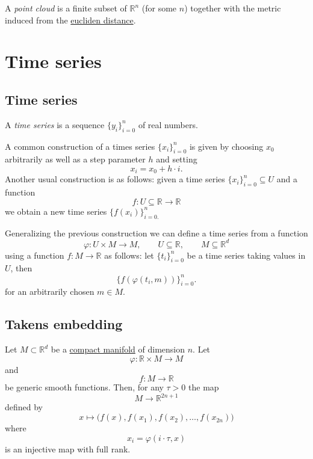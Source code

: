 \documentclass{amsart}
\begin{document}
	A \textit{point cloud} is a finite subset of $\mathbb{R}^n$ (for some $n$) together with the metric induced from the \hyperref[euclidean distance and norm]{eucliden distance}.
	
	\section{Time series}
	
	\subsection*{Time series} \label{time series}
	
	A \textit{time series} is a sequence $\{y_i\}_{i = 0}^n$ of real numbers. 
	
	A common construction of a times series $\{x_i\}_{i = 0}^n$ is given by choosing $x_0$ arbitrarily as well as a step parameter $h$ and setting
	\begin{equation*}
	x_i = x_0 + h\cdot i.
	\end{equation*}
	Another usual construction is as follows: given a time series $\{x_i\}_{i = 0}^n \subseteq U$ and a function
	\begin{equation*}
	f : U \subseteq \mathbb R \to \mathbb R
	\end{equation*}
	we obtain a new time series $\{f(x_i)\}_{i = 0.}^n$
	
	Generalizing the previous construction we can define a time series from a function 
	\begin{equation*}
	\varphi : U \times M \to M, \qquad U \subseteq \mathbb R, \qquad M \subseteq \mathbb R^d
	\end{equation*} 
	using a function $f : M \to \mathbb R$ as follows: let $\{t_i\}_{i=0}^n$ be a time series taking values in $U$, then
	\begin{equation*}
	\{f(\varphi(t_i, m))\}_{i=0}^n.
	\end{equation*}
	for an arbitrarily chosen $m \in M$.
	
	\subsection*{Takens embedding}	\label{takens embedding}
	
	Let $M \subset \mathbb R^d$ be a \hyperref[manifold]{compact manifold} of dimension $n$. Let
	\begin{equation*}
	\varphi : \mathbb R \times M \to M
	\end{equation*} 
	and
	\begin{equation*}
	f : M \to \mathbb R
	\end{equation*}
	be generic smooth functions. Then, for any $\tau > 0$ the map
	\begin{equation*}
	M \to \mathbb R^{2n+1}
	\end{equation*}
	defined by
	\begin{equation*}
	x \mapsto\big( f(x), f(x_1), f(x_2), \dots, f(x_{2n}) \big)
	\end{equation*}
	where 
	\begin{equation*}
	x_i = \varphi(i \cdot \tau, x)
	\end{equation*}
	is an injective map with full rank.
	
\end{document}
